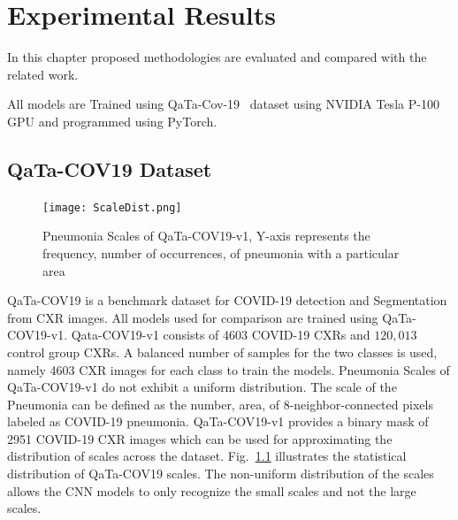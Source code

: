 
\chapter{Experimental Results} %

\label{chp:results} %
In this chapter proposed methodologies are evaluated and compared with the related work.

All models are Trained using QaTa-Cov-19~\cite{ahishali2021advance} dataset using NVIDIA Tesla P-100 GPU and programmed using PyTorch.
\section{QaTa-COV19 Dataset}
\begin{center}
\begin{figure}[htbp]
\centerline{\texttt{[image: ScaleDist.png]}}
\caption{Pneumonia Scales of QaTa-COV19-v1, Y-axis represents the frequency, number of occurrences, of pneumonia with a particular area}
\label{pdist}
\end{figure}
\end{center}
QaTa-COV19 is a benchmark dataset for COVID-19 detection and Segmentation from CXR images. All models used for comparison are trained using QaTa-COV19-v1. Qata-COV19-v1 consists of 4603 COVID-19 CXRs and $120,013$ control group CXRs. A balanced number of samples for the two classes is used, namely 4603 CXR images for each class to train the models. Pneumonia Scales of QaTa-COV19-v1 do not exhibit a uniform distribution. The scale of the Pneumonia can be defined as the number, area, of 8-neighbor-connected pixels labeled as COVID-19 pneumonia. QaTa-COV19-v1 provides a binary mask of 2951 COVID-19 CXR images which can be used for approximating the distribution of scales across the dataset. Fig.~\ref{pdist} illustrates the statistical distribution of QaTa-COV19 scales. The non-uniform distribution of the scales allows the CNN models to only recognize the small scales and not the large scales.

